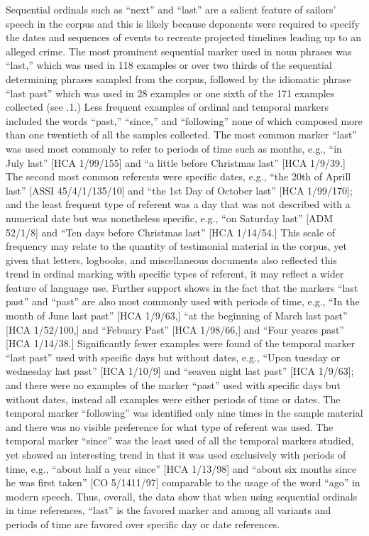 Sequential ordinals such as “next” and “last” are a salient feature of sailors’ speech in the corpus and this is likely because deponents were required to specify the dates and sequences of events to recreate projected timelines leading up to an alleged crime. The most prominent sequential marker used in noun phrases was “last,” which was used in 118 examples or over two thirds of the sequential determining phrases sampled from the corpus, followed by the idiomatic phrase “last past” which was used in 28 examples or one sixth of the 171 examples collected (see .1.) Less frequent examples of ordinal and temporal markers included the words “past,” “since,” and “following” none of which composed more than one twentieth of all the samples collected. The most common marker “last” was used most commonly to refer to periods of time such as months, e.g., “in July last” [HCA 1/99/155] and “a little before Christmas last” [HCA 1/9/39.] The second most common referents were specific dates, e.g., “the 20th of Aprill last” [ASSI 45/4/1/135/10] and “the 1st Day of October last” [HCA 1/99/170]; and the least frequent type of referent was a day that was not described with a numerical date but was nonetheless specific, e.g., “on Saturday last” [ADM 52/1/8] and “Ten days before Christmas last” [HCA 1/14/54.] This scale of frequency may relate to the quantity of testimonial material in the corpus, yet given that letters, logbooks, and miscellaneous documents also reflected this trend in ordinal marking with specific types of referent, it may reflect a wider feature of language use. Further support shows in the fact that the markers “last past” and “past” are also most commonly used with periods of time, e.g., “In the month of June last past” [HCA 1/9/63,] “at the beginning of March last past” [HCA 1/52/100,] and “Febuary Past” [HCA 1/98/66,] and “Four yeares past” [HCA 1/14/38.] Significantly fewer examples were found of the temporal marker “last past” used with specific days but without dates, e.g., “Upon tuesday or wednesday last past” [HCA 1/10/9] and “seaven night last past” [HCA 1/9/63]; and there were no examples of the marker “past” used with specific days but without dates, instead all examples were either periods of time or dates. The temporal marker “following” was identified only nine times in the sample material and there was no visible preference for what type of referent was used. The temporal marker “since” was the least used of all the temporal markers studied, yet showed an interesting trend in that it was used exclusively with periods of time, e.g., “about half a year since” [HCA 1/13/98] and “about six months since he was first taken” [CO 5/1411/97] comparable to the usage of the word “ago” in modern speech. Thus, overall, the data show that when using sequential ordinals in time references, “last” is the favored marker and among all variants and periods of time are favored over specific day or date references. 

